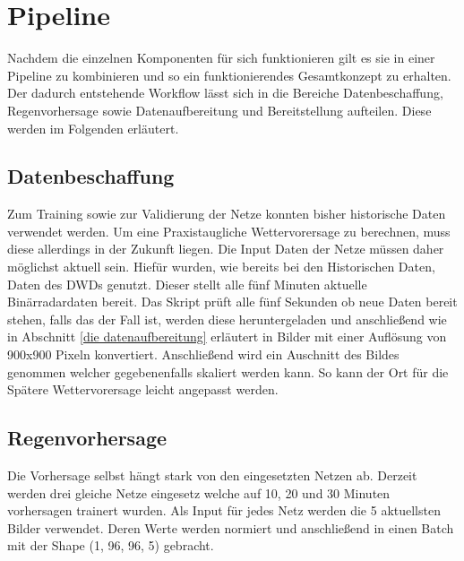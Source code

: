 \section{Pipeline}\label{sec: Pipeline}
Nachdem die einzelnen Komponenten für sich funktionieren gilt es sie in einer Pipeline zu kombinieren und so ein funktionierendes Gesamtkonzept zu erhalten.
Der dadurch entstehende Workflow lässt sich in die Bereiche Datenbeschaffung, Regenvorhersage sowie Datenaufbereitung und Bereitstellung aufteilen.
Diese werden im Folgenden erläutert.

\subsection{Datenbeschaffung}
Zum Training sowie zur Validierung der Netze konnten bisher historische Daten verwendet werden.
Um eine Praxistaugliche Wettervorersage zu berechnen, muss diese allerdings in der Zukunft liegen.
Die Input Daten der Netze müssen daher möglichst aktuell sein.
Hiefür wurden, wie bereits bei den Historischen Daten, Daten des DWDs genutzt.
Dieser stellt alle fünf Minuten aktuelle Binärradardaten bereit.
Das Skript prüft alle fünf Sekunden ob neue Daten bereit stehen, falls das der Fall ist, werden diese heruntergeladen und anschließend wie in Abschnitt \ref{die datenaufbereitung} erläutert in Bilder mit einer Auflösung von 900x900 Pixeln konvertiert.
Anschließend wird ein Auschnitt des Bildes genommen welcher gegebenenfalls skaliert werden kann.
So kann der Ort für die Spätere Wettervorersage leicht angepasst werden.

\subsection{Regenvorhersage}
Die Vorhersage selbst hängt stark von den eingesetzten Netzen ab.
Derzeit werden drei gleiche Netze eingesetz welche auf 10, 20 und 30 Minuten vorhersagen trainert wurden.
Als Input für jedes Netz werden die 5 aktuellsten Bilder verwendet.
Deren Werte werden normiert und anschließend in einen Batch mit der Shape (1, 96, 96, 5) gebracht.

